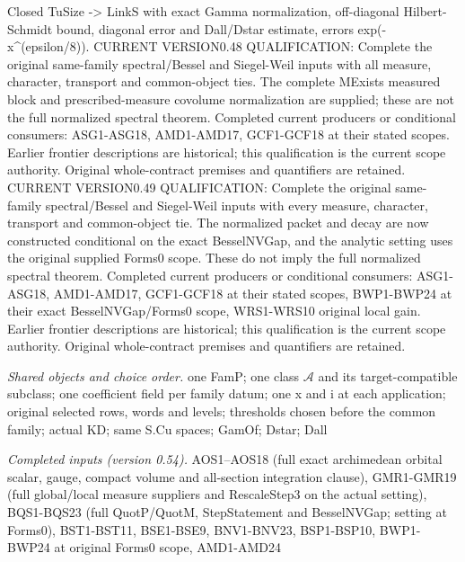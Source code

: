 \documentclass[11pt,a4paper]{article}
\numberwithin{equation}{section}
\theoremstyle{remark}\newtheorem{remark}[theorem]{Remark}
\begin{document}
Closed TuSize -> LinkS with exact Gamma normalization, off-diagonal Hilbert-Schmidt bound, diagonal error and Dall/Dstar estimate, errors exp(-x\textasciicircum{}(epsilon/8)). CURRENT VERSION0.48 QUALIFICATION: Complete the original same-family spectral/Bessel and Siegel-Weil inputs with all measure, character, transport and common-object ties. The complete MExists measured block and prescribed-measure covolume normalization are supplied; these are not the full normalized spectral theorem. Completed current producers or conditional consumers: ASG1-ASG18, AMD1-AMD17, GCF1-GCF18 at their stated scopes. Earlier frontier descriptions are historical; this qualification is the current scope authority. Original whole-contract premises and quantifiers are retained. CURRENT VERSION0.49 QUALIFICATION: Complete the original same-family spectral/Bessel and Siegel-Weil inputs with every measure, character, transport and common-object tie. The normalized packet and decay are now constructed conditional on the exact BesselNVGap, and the analytic setting uses the original supplied Forms0 scope. These do not imply the full normalized spectral theorem. Completed current producers or conditional consumers: ASG1-ASG18, AMD1-AMD17, GCF1-GCF18 at their stated scopes, BWP1-BWP24 at their exact BesselNVGap/Forms0 scope, WRS1-WRS10 original local gain. Earlier frontier descriptions are historical; this qualification is the current scope authority. Original whole-contract premises and quantifiers are retained.

\emph{Shared objects and choice order.} one FamP; one class $\mathcal A$ and its target-compatible subclass; one coefficient field per family datum; one x and i at each application; original selected rows, words and levels; thresholds chosen before the common family; actual KD; same S.Cu spaces; GamOf; Dstar; Dall

\emph{Completed inputs (version 0.54).} AOS1–AOS18 (full exact archimedean orbital scalar, gauge, compact volume and all-section integration clause), GMR1-GMR19 (full global/local measure suppliers and RescaleStep3 on the actual setting), BQS1-BQS23 (full QuotP/QuotM, StepStatement and BesselNVGap; setting at Forms0), BST1-BST11, BSE1-BSE9, BNV1-BNV23, BSP1-BSP10, BWP1-BWP24 at original Forms0 scope, AMD1-AMD24
\end{document}

